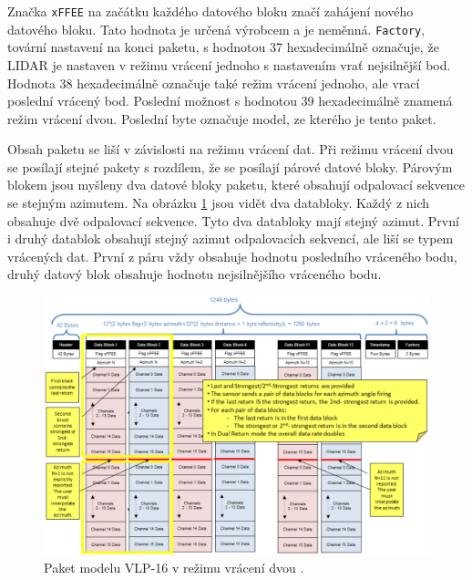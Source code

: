 \documentclass[czech,bachelor,dept420,male,cpdeclaration]{diploma}
\begin{document}
Značka \texttt{xFFEE} na začátku každého datového bloku značí zahájení nového datového bloku. Tato hodnota je určená výrobcem a je neměnná. \texttt{Factory}, tovární nastavení na konci paketu, s hodnotou \num{37} hexadecimálně označuje, že LIDAR je nastaven v režimu vrácení jednoho s nastavením vrať nejsilnější bod. Hodnota \num{38} hexadecimálně označuje také režim vrácení jednoho, ale vrací poslední vrácený bod. Poslední možnost s hodnotou \num{39} hexadecimálně znamená režim vrácení dvou. Poslední byte označuje model, ze kterého je tento paket.

Obsah paketu se liší v závislosti na režimu vrácení dat. Při režimu vrácení dvou se posílají stejné pakety s rozdílem, že se posílají párové datové bloky. Párovým blokem jsou myšleny dva datové bloky paketu, které obsahují odpalovací sekvence se stejným azimutem. Na obrázku \ref{fig:packet2} jsou vidět dva databloky. Každý z nich obsahuje dvě odpalovací sekvence. Tyto dva databloky mají stejný azimut. První i druhý datablok obsahují stejný azimut odpalovacích sekvencí, ale liší se typem vrácených dat. První z páru vždy obsahuje hodnotu posledního vráceného bodu, druhý datový blok obsahuje hodnotu nejsilnějšího vráceného bodu. 
 
\begin{figure}[H]
\includegraphics[width=\linewidth]{Figures/paket-dual.png}
\caption{ Paket modelu VLP-16 v režimu vrácení dvou \cite{packet}. }
\label{fig:packet2}
\end{figure}
\end{document}
